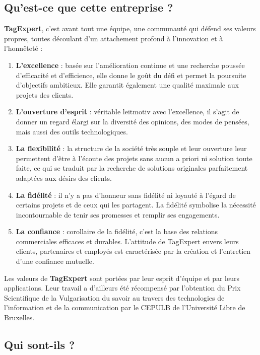 \documentclass{article}
\begin{document}
\begin{sffamily}
\subsection{Qu'est-ce que cette entreprise ?}

\textbf{TagExpert}, c'est avant tout une équipe, une communauté qui défend ses valeurs propres, toutes découlant d'un attachement profond à l'innovation et à l'honnêteté : 
\begin{enumerate}
\item \textbf{L’excellence} : basée sur l’amélioration continue et une recherche poussée d’efficacité et d’efficience, elle donne le goût du défi et permet la poursuite 
d’objectifs ambitieux. Elle garantit également une qualité maximale aux projets des clients.
\item \textbf{L’ouverture d’esprit } : véritable leitmotiv avec l’excellence, il s'agit de donner un regard élargi sur la diversité des opinions, des modes de pensées, mais 
aussi des outils technologiques.
\item \textbf{La flexibilité} :  la structure de la société très souple et leur ouverture leur permettent d’être à l’écoute des projets sans aucun a priori ni solution toute 
faite, ce qui se traduit par la recherche de solutions originales parfaitement adaptées aux désirs des clients.
\item \textbf{La fidélité} :  il n'y a pas d'honneur sans fidélité ni loyauté à l'égard de certains projets et de ceux qui les partagent. La fidélité symbolise la nécessité 
incontournable de tenir ses promesses et remplir ses engagements.
\item \textbf{La confiance} :  corollaire de la fidélité, c’est la base des relations commerciales efficaces et durables. L'attitude de TagExpert envers leurs clients, 
partenaires et employés est caractérisée par la création et l’entretien d’une confiance mutuelle.
\end{enumerate}

Les valeurs de \textbf{TagExpert} sont portées par leur esprit d’équipe et par leurs applications. Leur travail a d’ailleurs été récompensé par l’obtention du Prix Scientifique de la 
Vulgarisation du savoir au travers des technologies de l’information et de la communication par le CEPULB de l’Université Libre de Bruxelles. \\

\subsection{Qui sont-ils ?}


\end{sffamily}
\end{document}
